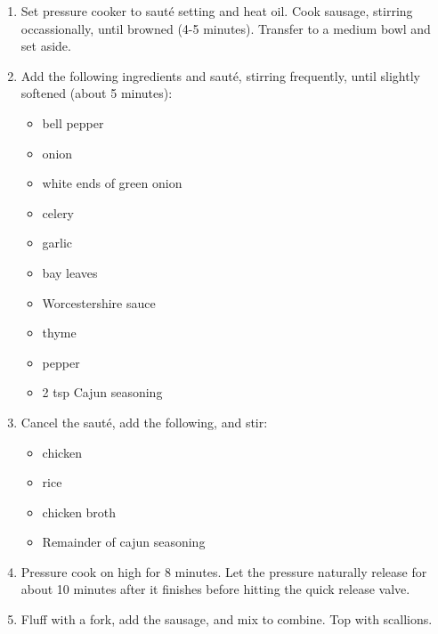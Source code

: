 \begin{enumerate}
\item Set pressure cooker to saut\'e setting and heat oil. Cook sausage, stirring occassionally, until browned (4-5
    minutes). Transfer to a medium bowl and set aside.
\item Add the following ingredients and saut\'e, stirring frequently, until slightly softened (about 5 minutes):
\begin{itemize}
    \item bell pepper
    \item onion
    \item white ends of green onion
    \item celery
    \item garlic
    \item bay leaves
    \item Worcestershire sauce
    \item thyme
    \item pepper
    \item 2 tsp Cajun seasoning
\end{itemize}
\item Cancel the saut\'e, add the following, and stir:
\begin{itemize}
    \item chicken
    \item rice
    \item chicken broth
    \item Remainder of cajun seasoning
\end{itemize}
\item Pressure cook on high for 8 minutes. Let the pressure naturally release for about 10 minutes after it finishes
    before hitting the quick release valve.
\item Fluff with a fork, add the sausage, and mix to combine. Top with scallions.
\end{enumerate}
